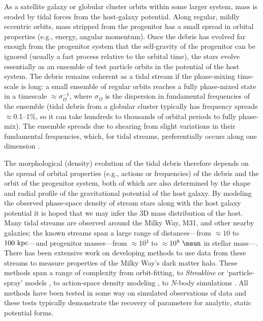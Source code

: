 As a satellite galaxy or globular cluster orbits within some larger system, mass
is eroded by tidal forces from the host-galaxy potential. Along regular, mildly
eccentric orbits, mass stripped from the progenitor has a small spread in
orbital properties (e.g., energy, angular momentum). Once the debris has evolved
far enough from the progenitor system that the self-gravity of the progenitor
can be ignored (usually a fast process relative to the orbital time), the stars
evolve essentially as an ensemble of test particle orbits in the potential of
the host system. The debris remains coherent as a tidal stream if the
phase-mixing time-scale is long: a small ensemble of regular orbits reaches a
fully phase-mixed state in a timescale $\approx\sigma_\Omega^{-1}$, where
$\sigma_\Omega$ is the dispersion in fundamental frequencies of the ensemble
(tidal debris from a globular cluster typically has frequency spreads
$\approx$0.1--1\%, so it can take hundreds to thousands of orbital periods to
fully phase-mix). The ensemble spreads due to shearing from slight variations in
their fundamental frequencies, which, for tidal streams, preferentially occurs
along one dimension \citep{merritt96, helmi99}.

The morphological (density) evolution of the tidal debris therefore depends on
the spread of orbital properties (e.g., actions or frequencies) of the debris
and the orbit of the progenitor system, both of which are also determined by the
shape and radial profile of the gravitational potential of the host galaxy. By
modeling the observed phase-space density of stream stars along with the host
galaxy potential it is hoped that we may infer the 3D mass distribution of the
host. Many tidal streams are observed around the Milky Way, M31, and other
nearby galaxies; the known streams span a large range of distances---from
$\approx10$ to $100~{\rm kpc}$---and progenitor masses---from $\approx$10$^3$ to
$\approx$10$^8~\msun$ in stellar mass---\citep[][]{ibata94,odenkirchen01,
belokurov06,grillmair06a,grillmair06b,bonaca12}. There has been extensive work
on developing methods to use data from these streams to measure properties of
the Milky Way's dark matter halo. These methods span a range of complexity from
orbit-fitting, to \emph{Streakline} \citep{kuepper12} or `particle-spray' models
\citep{gibbons14}, to action-space density modeling \citep[e.g.,][]{sanders14,
bovy14}, to $N$-body simulations \citep[e.g.,][]{law10}. All methods have been
tested in some way on simulated observations of data and these tests typically
demonstrate the recovery of parameters for analytic, static potential forms.

